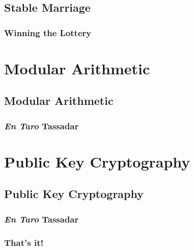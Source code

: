 \documentclass[9pt]{beamer}
\begin{document}
\subsection{Stable Marriage}

\begin{frame}[fragile]
  \frametitle{Winning the Lottery}
\end{frame}


\section{Modular Arithmetic}
  \subsection{Modular Arithmetic}

\begin{frame}[fragile]
  \frametitle{\emph{En Taro} Tassadar}
\end{frame}


\section{Public Key Cryptography}
  \subsection{Public Key Cryptography}

\begin{frame}[fragile]
  \frametitle{\emph{En Taro} Tassadar}
\end{frame}


\begin{frame}
  \frametitle{\huge{That's it!}}
\end{frame}
\end{document}
